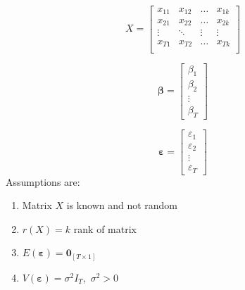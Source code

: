 \documentclass{book}
\begin{document}
\begin{equation}
\nonumber
X=\left[\begin{array}{cccc}
x_{11}&x_{12}&\ldots&x_{1k}\\
x_{21}&x_{22}&\ldots&x_{2k}\\
\vdots&\ddots&\vdots&\vdots\\
x_{T1}&x_{T2}&\ldots&x_{Tk}\\
\end{array}\right]
\end{equation}

\begin{equation}
\nonumber
\pmb{\beta}=\left[\begin{array}{c}
\beta_{1}\\
\beta_{2}\\
\vdots\\
\beta_{T}
\end{array}\right]
\end{equation}

\begin{equation}
\nonumber
\pmb{\varepsilon}=\left[\begin{array}{c}
\varepsilon_{1}\\
\varepsilon_{2}\\
\vdots\\
\varepsilon_{T}
\end{array}\right]
\end{equation}
Assumptions are:
\begin{enumerate}
\item Matrix $X$ is known and not random
\item $r(X)=k$ rank of matrix
\item $E(\pmb{\varepsilon})=\mathbf{0}_{[T\times 1]}$
\item $V(\pmb{\varepsilon})=\sigma^{2}I_{T}$,\ $\sigma^{2}>0$
\end{enumerate}
\end{document}
